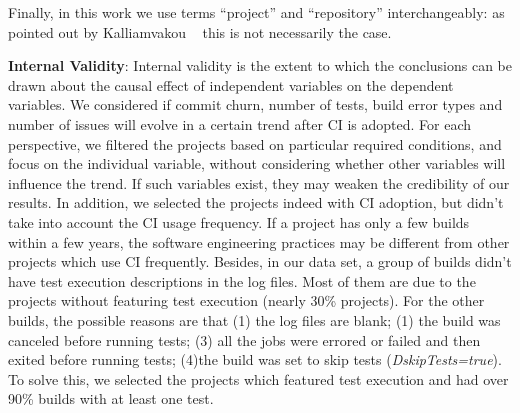 Finally, in this work we use terms ``project'' and ``repository'' interchangeably: as pointed out by Kalliamvakou \etal~\cite{Kalliamvakou2014Promises} this is not necessarily the case. 




\textbf{Internal Validity}:
Internal validity is the extent to which the conclusions can be drawn about the causal effect of independent variables on the dependent variables. We considered if commit churn, number of tests, build error types and number of issues will evolve in a certain trend after CI is adopted. For each perspective, we filtered the projects based on particular required conditions, and focus on the individual variable, without considering whether other variables will influence the trend. If such variables exist, they may weaken the credibility of our results.
In addition, we selected the projects indeed with CI adoption, but didn't take into account the CI usage frequency. If a project has only a few builds within a few years, the software engineering practices may be different from other projects which use CI frequently. 
Besides, in our data set, a group of builds didn't have test execution descriptions in the log files. Most of them are due to the projects without featuring test execution (nearly 30\% projects). For the other builds, the possible reasons are that (1) the log files are blank; (1) the build was canceled before running tests; (3) all the jobs were errored or failed and then exited before running tests; (4)the build was set to skip tests (\eg \textit{DskipTests=true}). To solve this, we selected the projects which featured test execution and had over 90\% builds with at least one test.


